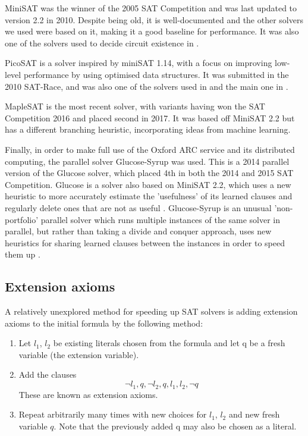 \documentclass{article}
\begin{document}
MiniSAT\cite{minisat} was the winner of the 2005 SAT Competition and was last updated to version 2.2 in 2010\cite{minisat2010}. Despite being old, it is well-documented and the other solvers we used were based on it, making it a good baseline for performance. It was also one of the solvers used to decide circuit existence in \cite{kulikov}.

PicoSAT is a solver inspired by miniSAT 1.14, with a focus on improving low-level performance by using optimised data structures\cite{picosat}. It was submitted in the 2010 SAT-Race, and was also one of the solvers used in \cite{kulikov} and the main one in \cite{kulikovlocal}.

MapleSAT is the most recent solver, with variants having won the SAT Competition 2016 and placed second in 2017. It was based off MiniSAT 2.2 but has a different branching heuristic, incorporating ideas from machine learning\cite{maplesat}.

Finally, in order to make full use of the Oxford ARC service and its distributed computing, the parallel solver Glucose-Syrup was used. This is a 2014 parallel version of the Glucose solver, which placed 4th in both the 2014 and 2015 SAT Competition. Glucose is a solver also based on MiniSAT 2.2, which uses a new heuristic to more accurately estimate the 'usefulness' of its learned clauses and regularly delete ones that are not as useful \cite{glucose}. Glucose-Syrup is an unusual 'non-portfolio' parallel solver which runs multiple instances of the same solver in parallel, but rather than taking a divide and conquer approach, uses new heuristics for sharing learned clauses between the instances in order to speed them up \cite{glucose-syrup}.

\subsection{Extension axioms}

A relatively unexplored method for speeding up SAT solvers is adding extension axioms to the initial formula by the following method:

\begin{enumerate}
  \item Let $l_1$, $l_2$ be existing literals chosen from the formula and let q be a fresh variable (the extension variable).
  \item Add the clauses
  \[
    {\neg l_1, q}, {\neg l_2, q}, {l_1, l_2, \neg q}
  \]
  These are known as extension axioms.
  \item Repeat arbitrarily many times with new choices for $l_1$, $l_2$ and new fresh variable $q$. Note that the previously added q may also be chosen as a literal.
\end{enumerate}
\end{document}
